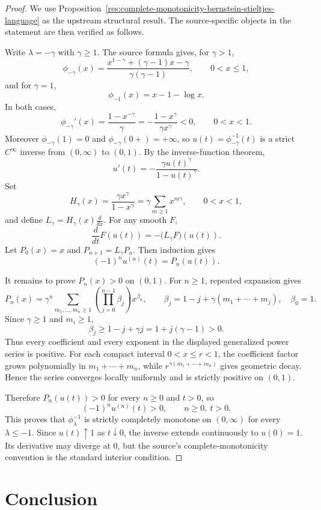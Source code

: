 \documentclass[11pt]{article}
\numberwithin{equation}{section}
\theoremstyle{definition}
\theoremstyle{remark}
\newcommand{\1}{\mathbf 1}
\begin{document}
\begin{proof}
We use Proposition~\ref{res:complete-monotonicity-bernstein-stieltjes-language} as the upstream structural result. The source-specific objects in the statement are then verified as follows.

Write \(\lambda=-\gamma\) with \(\gamma\ge1\). The source formula gives, for \(\gamma>1\),
\[
\phi_{-\gamma}(x)=\frac{x^{1-\gamma}+(\gamma-1)x-\gamma}{\gamma(\gamma-1)},\qquad 0<x\le1,
\]
and for \(\gamma=1\),
\[
\phi_{-1}(x)=x-1-\log x.
\]
In both cases,
\[
\phi_{-\gamma}'(x)=\frac{1-x^{-\gamma}}{\gamma}
=-\frac{1-x^\gamma}{\gamma x^\gamma}<0,\qquad 0<x<1.
\]
Moreover \(\phi_{-\gamma}(1)=0\) and \(\phi_{-\gamma}(0+)=+\infty\), so \(u(t)=\phi_{-\gamma}^{-1}(t)\) is a strict \(C^\infty\) inverse from \((0,\infty)\) to \((0,1)\). By the inverse-function theorem,
\[
u'(t)=-\frac{\gamma u(t)^\gamma}{1-u(t)^\gamma}.
\]
Set
\[
H_\gamma(x)=\frac{\gamma x^\gamma}{1-x^\gamma}
=\gamma\sum_{m\ge1}x^{m\gamma},\qquad 0<x<1,
\]
and define \(L_\gamma=H_\gamma(x)\frac{d}{dx}\). For any smooth \(F\),
\[
\frac{d}{dt}F(u(t))=-\bigl(L_\gamma F\bigr)(u(t)).
\]
Let \(P_0(x)=x\) and \(P_{n+1}=L_\gamma P_n\). Then induction gives
\[
(-1)^n u^{(n)}(t)=P_n(u(t)).
\]

It remains to prove \(P_n(x)>0\) on \((0,1)\). For \(n\ge1\), repeated expansion gives
\[
P_n(x)=\gamma^n\sum_{m_1,\ldots,m_n\ge1}
\left(\prod_{j=0}^{n-1}\beta_j\right)x^{\beta_n},
\qquad
\beta_j=1-j+\gamma(m_1+\cdots+m_j),\quad \beta_0=1.
\]
Since \(\gamma\ge1\) and \(m_i\ge1\),
\[
\beta_j\ge1-j+\gamma j=1+j(\gamma-1)>0.
\]
Thus every coefficient and every exponent in the displayed generalized power series is positive. For each compact interval \(0<x\le r<1\), the coefficient factor grows polynomially in \(m_1+\cdots+m_n\), while \(r^{\gamma(m_1+\cdots+m_n)}\) gives geometric decay. Hence the series converges locally uniformly and is strictly positive on \((0,1)\).

Therefore \(P_n(u(t))>0\) for every \(n\ge0\) and \(t>0\), so
\[
(-1)^n u^{(n)}(t)>0,\qquad n\ge0,\ t>0.
\]
This proves that \(\phi_\lambda^{-1}\) is strictly completely monotone on \((0,\infty)\) for every \(\lambda\le-1\). Since \(u(t)\uparrow1\) as \(t\downarrow0\), the inverse extends continuously to \(u(0)=1\). Its derivative may diverge at \(0\), but the source's complete-monotonicity convention is the standard interior condition.
\end{proof}

\section{Conclusion}
\end{document}
